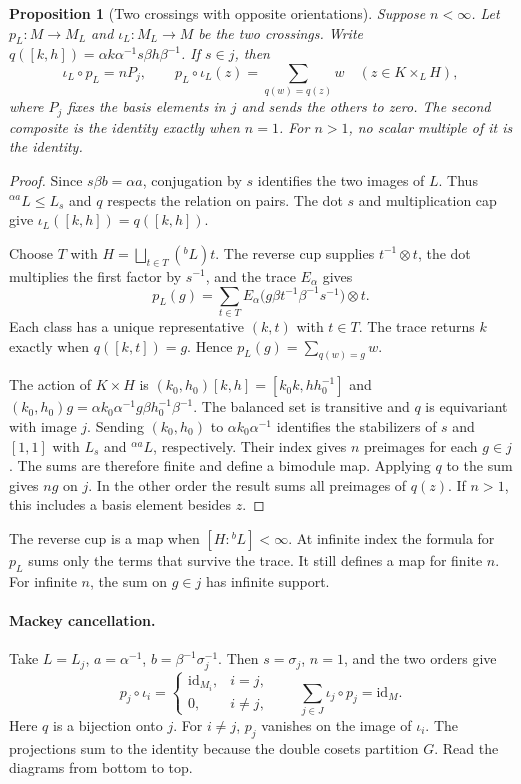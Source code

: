 \documentclass[11pt,a4paper]{article}
\numberwithin{equation}{section}
\newtheorem{proposition}[theorem]{Proposition}
\theoremstyle{definition}
\newcommand{\id}{\mathrm{id}}
\newcommand{\cg}[2]{{}^{#1}\!#2}
\begin{document}
\begin{proposition}[Two crossings with opposite orientations]\label{prop:r2-mixed-composition}
Suppose \(n<\infty\). Let \(p_L:M\to M_L\) and \(\iota_L:M_L\to M\)
be the two crossings. Write
\(q([k,h])=\alpha k\alpha^{-1}s\beta h\beta^{-1}\).
If \(s\in j\), then
\[
 \iota_L\circ p_L=nP_j,\qquad
 p_L\circ\iota_L(z)=\sum_{q(w)=q(z)}w \quad(z\in K\times_L H),
\]
where \(P_j\) fixes the basis elements in \(j\) and sends the others
to zero. The second composite is the identity exactly when \(n=1\).
For \(n>1\), no scalar multiple of it is the identity.
\end{proposition}

\begin{proof}
Since \(s\beta b=\alpha a\), conjugation by \(s\) identifies the
two images of \(L\). Thus \(\cg{\alpha a}{L}\le L_s\) and \(q\)
respects the relation on pairs. The dot \(s\) and multiplication
cap give \(\iota_L([k,h])=q([k,h])\).

Choose \(T\) with \(H=\bigsqcup_{t\in T}(\cg{b}{L})t\).
The reverse cup supplies \(t^{-1}\otimes t\), the dot multiplies
the first factor by \(s^{-1}\), and the trace \(E_\alpha\) gives
\[
 p_L(g)=\sum_{t\in T}
 E_\alpha\bigl(g\beta t^{-1}\beta^{-1}s^{-1}\bigr)\otimes t .
\]
Each class has a unique representative \((k,t)\) with \(t\in T\).
The trace returns \(k\) exactly when \(q([k,t])=g\).
Hence \(p_L(g)=\sum_{q(w)=g}w\).

The action of \(K\times H\) is
\((k_0,h_0)[k,h]=[k_0k,hh_0^{-1}]\) and
\((k_0,h_0)g=\alpha k_0\alpha^{-1}g\beta h_0^{-1}\beta^{-1}\).
The balanced set is transitive and \(q\) is equivariant with image
\(j\). Sending \((k_0,h_0)\) to \(\alpha k_0\alpha^{-1}\)
identifies the stabilizers of \(s\) and \([1,1]\) with \(L_s\)
and \(\cg{\alpha a}{L}\), respectively. Their index gives \(n\)
preimages for each \(g\in j\). The sums are therefore finite
and define a bimodule map. Applying \(q\) to the sum gives \(ng\)
on \(j\). In the other order the result sums all preimages of
\(q(z)\). If \(n>1\), this includes a basis element besides \(z\).
\end{proof}

The reverse cup is a map when \([H:\cg{b}{L}]<\infty\). At infinite
index the formula for \(p_L\) sums only the terms that survive the trace.
It still defines a map for finite \(n\). For infinite \(n\), the sum
on \(g\in j\) has infinite support.

\paragraph{Mackey cancellation.}
Take \(L=L_j\), \(a=\alpha^{-1}\), \(b=\beta^{-1}\sigma_j^{-1}\).
Then \(s=\sigma_j\), \(n=1\), and the two orders give
\[
 p_j\circ\iota_i=
 \begin{cases}
   \id_{M_i},&i=j,\\
   0,&i\ne j,
 \end{cases}
 \qquad
 \sum_{j\in J}\iota_j\circ p_j=\id_M .
\]
Here \(q\) is a bijection onto \(j\).
For \(i\ne j\), \(p_j\) vanishes on the image of \(\iota_i\).
The projections sum to the identity because the double cosets
partition \(G\). Read the diagrams from bottom to top.
\end{document}

